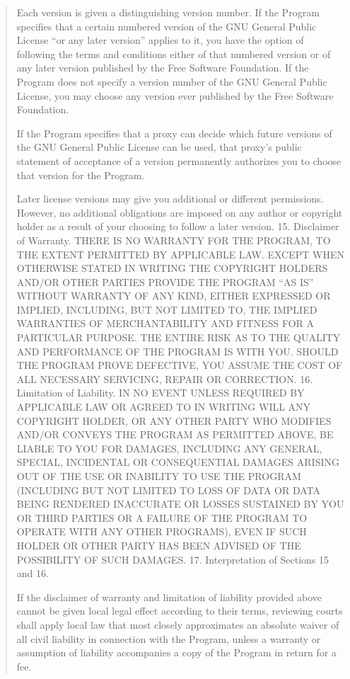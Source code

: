 \documentclass[letterpaper,10pt,english]{sphinxmanual}
\begin{document}
\begin{quote}
Each version is given a distinguishing version number. If the Program specifies that a certain numbered version of the GNU General Public License “or any later version” applies to it, you have the option of following the terms and conditions either of that numbered version or of any later version published by the Free Software Foundation. If the Program does not specify a version number of the GNU General Public License, you may choose any version ever published by the Free Software Foundation.

If the Program specifies that a proxy can decide which future versions of the GNU General Public License can be used, that proxy’s public statement of acceptance of a version permanently authorizes you to choose that version for the Program.

Later license versions may give you additional or different permissions. However, no additional obligations are imposed on any author or copyright holder as a result of your choosing to follow a later version.
15. Disclaimer of Warranty.
THERE IS NO WARRANTY FOR THE PROGRAM, TO THE EXTENT PERMITTED BY APPLICABLE LAW. EXCEPT WHEN OTHERWISE STATED IN WRITING THE COPYRIGHT HOLDERS AND/OR OTHER PARTIES PROVIDE THE PROGRAM “AS IS” WITHOUT WARRANTY OF ANY KIND, EITHER EXPRESSED OR IMPLIED, INCLUDING, BUT NOT LIMITED TO, THE IMPLIED WARRANTIES OF MERCHANTABILITY AND FITNESS FOR A PARTICULAR PURPOSE. THE ENTIRE RISK AS TO THE QUALITY AND PERFORMANCE OF THE PROGRAM IS WITH YOU. SHOULD THE PROGRAM PROVE DEFECTIVE, YOU ASSUME THE COST OF ALL NECESSARY SERVICING, REPAIR OR CORRECTION.
16. Limitation of Liability.
IN NO EVENT UNLESS REQUIRED BY APPLICABLE LAW OR AGREED TO IN WRITING WILL ANY COPYRIGHT HOLDER, OR ANY OTHER PARTY WHO MODIFIES AND/OR CONVEYS THE PROGRAM AS PERMITTED ABOVE, BE LIABLE TO YOU FOR DAMAGES, INCLUDING ANY GENERAL, SPECIAL, INCIDENTAL OR CONSEQUENTIAL DAMAGES ARISING OUT OF THE USE OR INABILITY TO USE THE PROGRAM (INCLUDING BUT NOT LIMITED TO LOSS OF DATA OR DATA BEING RENDERED INACCURATE OR LOSSES SUSTAINED BY YOU OR THIRD PARTIES OR A FAILURE OF THE PROGRAM TO OPERATE WITH ANY OTHER PROGRAMS), EVEN IF SUCH HOLDER OR OTHER PARTY HAS BEEN ADVISED OF THE POSSIBILITY OF SUCH DAMAGES.
17. Interpretation of Sections 15 and 16.

If the disclaimer of warranty and limitation of liability provided above cannot be given local legal effect according to their terms, reviewing courts shall apply local law that most closely approximates an absolute waiver of all civil liability in connection with the Program, unless a warranty or assumption of liability accompanies a copy of the Program in return for a fee.
\end{quote}
\end{document}
